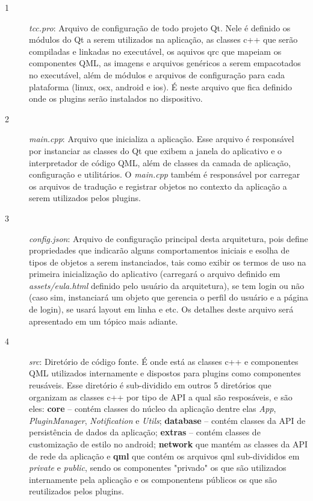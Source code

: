 \begin{description}
	\item[1] \textit{tcc.pro}: Arquivo de configuração de todo projeto Qt. Nele é definido os módulos do Qt a serem utilizados na aplicação, as classes c++ que serão compiladas e linkadas no executável, os aquivos qrc que mapeiam os componentes QML, as imagens e arquivos genéricos a serem empacotados no executável, além de módulos e arquivos de configuração para cada plataforma (linux, osx, android e ios). É neste arquivo que fica definido onde os plugins serão instalados no dispositivo.

	\item[2] \textit{main.cpp}: Arquivo que inicializa a aplicação. Esse arquivo é responsável por instanciar as classes do Qt que exibem a janela do aplicativo e o interpretador de código QML, além de classes da camada de aplicação, configuração e utilitários. O \textit{main.cpp} também é responsável por carregar os arquivos de tradução e registrar objetos no contexto da aplicação a serem utilizados pelos plugins.

	\item[3] \textit{config.json}: Arquivo de configuração principal desta arquitetura, pois define propriedades que indicarão alguns comportamentos iniciais e esolha de tipos de objetos a serem instanciados, tais como exibir os termos de uso na primeira inicialização do aplicativo (carregará o arquivo definido em \textit{assets/eula.html} definido pelo usuário da arquitetura), se tem login ou não (caso sim, instanciará um objeto que gerencia o perfil do usuário e a página de login), se usará layout em linha e etc. Os detalhes deste arquivo será apresentado em um tópico mais adiante.

	\item[4] \textit{src}: Diretório de código fonte. É onde está as classes c++ e componentes QML utilizados internamente e dispostos para plugins como componentes reusáveis. Esse diretório é sub-dividido em outros 5 diretórios que organizam as classes c++ por tipo de API a qual são resposáveis, e são eles: \textbf{core} -- contém classes do núcleo da aplicação dentre elas \textit{App}, \textit{PluginManager}, \textit{Notification} e \textit{Utils}; \textbf{database} -- contém classes da API de persistência de dados da aplicação; \textbf{extras} -- contém classes de customização de estilo no android; \textbf{network} que mantém as classes da API de rede da aplicação e \textbf{qml} que contém os arquivos qml sub-divididos em \textit{private} e \textit{public}, sendo os componentes "privado" os que são utilizados internamente pela aplicação e os componentens públicos os que são reutilizados pelos plugins.


\end{description}
